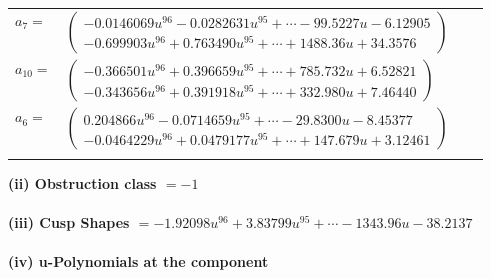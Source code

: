\documentclass[1p]{elsarticle_modified}
\theoremstyle{definition}
\begin{document}
\begin{tabular}{m{7pt} m{180pt} m{7pt} m{180pt} }
\flushright $a_{7}=$&$\begin{pmatrix}-0.0146069 u^{96}-0.0282631 u^{95}+\cdots-99.5227 u-6.12905\\-0.699903 u^{96}+0.763490 u^{95}+\cdots+1488.36 u+34.3576\end{pmatrix}$ \\
\flushright $a_{10}=$&$\begin{pmatrix}-0.366501 u^{96}+0.396659 u^{95}+\cdots+785.732 u+6.52821\\-0.343656 u^{96}+0.391918 u^{95}+\cdots+332.980 u+7.46440\end{pmatrix}$ \\
\flushright $a_{6}=$&$\begin{pmatrix}0.204866 u^{96}-0.0714659 u^{95}+\cdots-29.8300 u-8.45377\\-0.0464229 u^{96}+0.0479177 u^{95}+\cdots+147.679 u+3.12461\end{pmatrix}$\\&\end{tabular}
\flushleft \textbf{(ii) Obstruction class $= -1$}\\~\\
\flushleft \textbf{(iii) Cusp Shapes $= -1.92098 u^{96}+3.83799 u^{95}+\cdots-1343.96 u-38.2137$}\\~\\
\newpage\renewcommand{\arraystretch}{1}
\flushleft \textbf{(iv) u-Polynomials at the component}\newline \\
\end{document}
